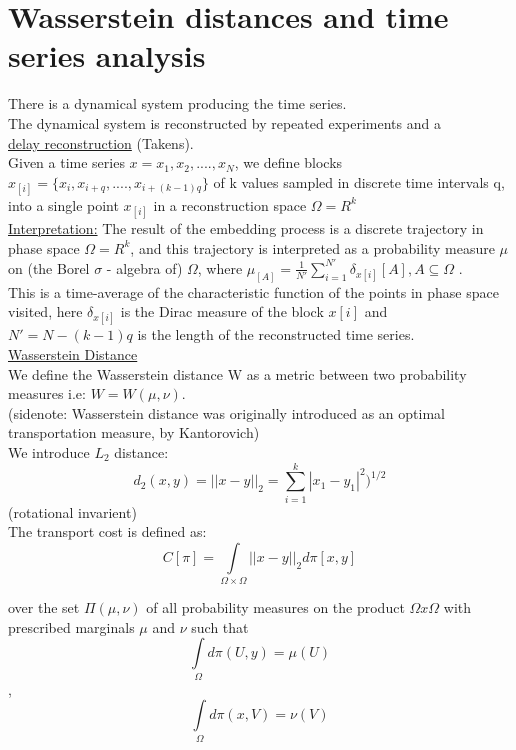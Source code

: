 \documentclass[11pt]{article}
\begin{document}
\section{Wasserstein distances and time series analysis}

There is a dynamical system producing the time series. \\
The dynamical system is reconstructed by repeated experiments and a\\
 \underline{delay reconstruction}  (Takens). \\
 
Given a time series $x={x_{1},x_{2},....,x_{N}}$, we define blocks $x_{[i]}=\{x_{i},x_{i+q},....,x_{i+(k-1)q}\}$ of k values sampled in discrete time intervals q, into a single point $x_{[i]}$ in a reconstruction space $\Omega = R^{k}$\\

\underline{Interpretation:} The result of the embedding process is a discrete trajectory in phase space $\Omega = R^{k}$, and this trajectory is interpreted as a probability measure $\mu$ on (the Borel $\sigma$ - algebra of) $\Omega$, where $\mu_{[A]} = \frac{1}{N'} \sum\limits_{i=1}^{N'} \delta_{x[i]}[A], A\subseteq\Omega$ . \\

This is a time-average of the characteristic function of the points in phase space visited, here $\delta_{x[i]}$ is the Dirac measure of the block $x[i]$ and $N' = N-(k-1)q$ is the length of the reconstructed time series. \\

\underline{Wasserstein Distance}\\
We define the Wasserstein distance W as a metric between two probability measures i.e: $W = W(\mu,\nu)$. \\
(sidenote: Wasserstein distance was originally introduced as an optimal transportation measure, by Kantorovich)\\

We introduce $L_{2}$ distance: $$d_{2}(x,y) = ||x-y||_{2} = \sum\limits_{i=1}^{k} |x_{1}- y_{1}|^{2})^{1/2}$$ (rotational invarient)\\

The transport cost is defined as: $$C[\pi] = \int\limits_{\Omega \times \Omega} ||x-y||_{2}  d\pi[x,y]$$

over the set $\Pi(\mu,\nu)$ of all probability measures on the product $\Omega x \Omega$ with prescribed marginals $\mu$ and $\nu$ such that
$$\int\limits_{\Omega} d\pi (U,y) = \mu(U)$$, $$\int\limits_{\Omega} d\pi (x,V) = \nu(V)$$
\end{document}
